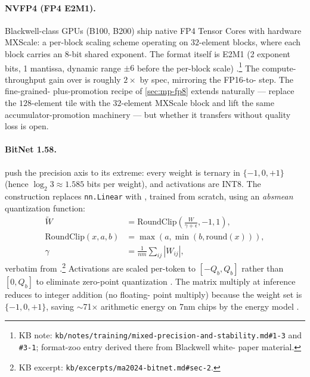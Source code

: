 \paragraph{NVFP4 (FP4 E2M1).} Blackwell-class GPUs (B100, B200) ship
native FP4 Tensor Cores with hardware MXScale: a per-block scaling
scheme operating on $32$-element blocks, where each block carries an
8-bit shared exponent. The format itself is E2M1 (2 exponent bits, 1
mantissa, dynamic range $\pm 6$ before the per-block scale)
\citep[\S 3.3, format zoo]{deepseek-v3}.\footnote{KB note:
\texttt{kb/notes/training/mixed-precision-and-stability.md\#1-3} and
\texttt{\#3-1}; format-zoo entry derived there from Blackwell white-
paper material.} The compute-throughput gain over  is roughly
$2\times$ by spec, mirroring the FP16-to- step. The fine-grained-
plus-promotion recipe of \cref{sec:mp-fp8} extends naturally — replace
the $128$-element tile with the $32$-element MXScale block and lift
the same accumulator-promotion machinery — but whether it transfers
without quality loss is open.

\paragraph{BitNet 1.58.} \citet{ma2024-bitnet} push the precision
axis to its extreme: every weight is ternary in $\{-1, 0, +1\}$
(hence $\log_2 3 \approx 1.585$ bits per weight), and activations are
INT8. The construction replaces \texttt{nn.Linear} with
\texttt{}, trained from scratch, using an \emph{absmean}
quantization function:
\begin{align}
\widetilde{W} &= \mathrm{RoundClip}\!\left(\tfrac{W}{\gamma + \epsilon}, -1, 1\right),
   \label{eq:bitnet-quant} \\
\mathrm{RoundClip}(x, a, b) &= \max(a, \min(b, \mathrm{round}(x))),
   \label{eq:roundclip} \\
\gamma &= \tfrac{1}{nm} \sum_{ij} |W_{ij}|,
   \label{eq:bitnet-gamma}
\end{align}
verbatim from \citet[\S 2, eqs.\ 1--3]{ma2024-bitnet}.\footnote{KB
excerpt: \texttt{kb/excerpts/ma2024-bitnet.md\#sec-2}.} Activations
are scaled per-token to $[-Q_b, Q_b]$ rather than $[0, Q_b]$ to
eliminate zero-point quantization \citep[\S 2]{ma2024-bitnet}. The
matrix multiply at inference reduces to integer addition (no floating-
point multiply) because the weight set is $\{-1, 0, +1\}$, saving
$\sim$71$\times$ arithmetic energy on 7nm chips by the
\citet{ma2024-bitnet} energy model \citep[\S 3]{ma2024-bitnet}.

